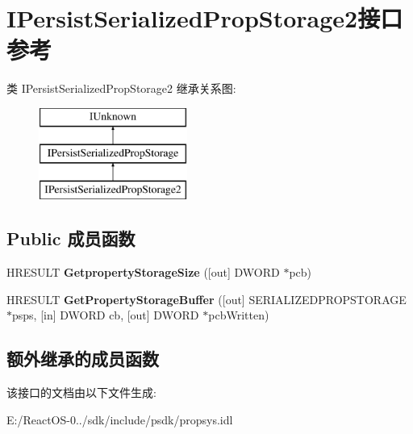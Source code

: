 \hypertarget{interface_i_persist_serialized_prop_storage2}{}\section{I\+Persist\+Serialized\+Prop\+Storage2接口 参考}
\label{interface_i_persist_serialized_prop_storage2}
类 I\+Persist\+Serialized\+Prop\+Storage2 继承关系图\+:\begin{figure}[H]
\begin{center}
\leavevmode
\includegraphics[height=3.000000cm]{interface_i_persist_serialized_prop_storage2}
\end{center}
\end{figure}
\subsection*{Public 成员函数}
\begin{DoxyCompactItemize}
\item 
\mbox{\label{interface_i_persist_serialized_prop_storage2_abb8e8de37a0548cb3b3b2e74484bcff0}} 
H\+R\+E\+S\+U\+LT {\bfseries Getproperty\+Storage\+Size} (\mbox{[}out\mbox{]} D\+W\+O\+RD $\ast$pcb)
\item 
\mbox{\label{interface_i_persist_serialized_prop_storage2_a04ee488d22c13c4819ec443176f249e7}} 
H\+R\+E\+S\+U\+LT {\bfseries Get\+Property\+Storage\+Buffer} (\mbox{[}out\mbox{]} S\+E\+R\+I\+A\+L\+I\+Z\+E\+D\+P\+R\+O\+P\+S\+T\+O\+R\+A\+GE $\ast$psps, \mbox{[}in\mbox{]} D\+W\+O\+RD cb, \mbox{[}out\mbox{]} D\+W\+O\+RD $\ast$pcb\+Written)
\end{DoxyCompactItemize}
\subsection*{额外继承的成员函数}


该接口的文档由以下文件生成\+:\begin{DoxyCompactItemize}
\item 
E\+:/\+React\+O\+S-\/0../sdk/include/psdk/propsys.\+idl\end{DoxyCompactItemize}
